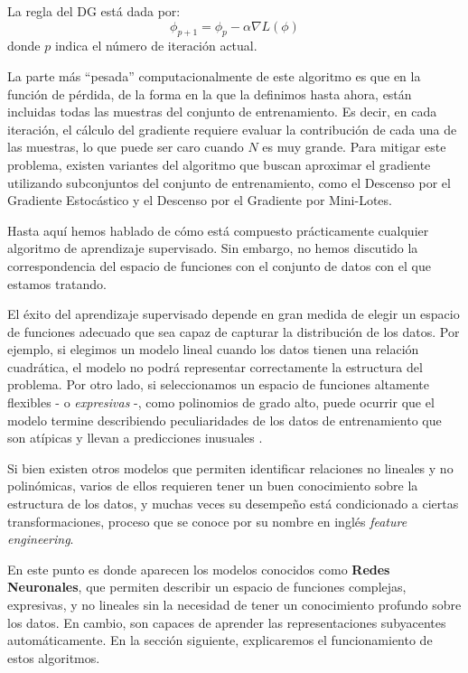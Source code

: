 \documentclass[../../main.tex]{subfiles}
\begin{document}
La regla del DG está dada por:
\[
\phi_{p+1} = \phi_{p} - \alpha \nabla L(\phi)
\]
donde \(p\) indica el número de iteración actual.

La parte más ``pesada'' computacionalmente de este algoritmo es que en la función de
pérdida, de la forma en la que la definimos hasta ahora, están incluidas todas las
muestras del conjunto de entrenamiento. Es decir, en cada iteración, el cálculo del
gradiente requiere evaluar la contribución de cada una de las muestras, lo que puede ser
caro cuando \(N\) es muy grande. Para mitigar este problema, existen variantes del
algoritmo que buscan aproximar el gradiente utilizando subconjuntos del conjunto de
entrenamiento, como el Descenso por el Gradiente Estocástico y el Descenso por el
Gradiente por Mini-Lotes.


\bigskip
Hasta aquí hemos hablado de cómo está compuesto prácticamente cualquier algoritmo de
aprendizaje supervisado. Sin embargo, no hemos discutido la correspondencia del espacio de
funciones con el conjunto de datos con el que estamos tratando.

El éxito del aprendizaje supervisado depende en gran medida de elegir un espacio de
funciones adecuado que sea capaz de capturar la distribución de los datos. Por ejemplo, si
elegimos un modelo lineal cuando los datos tienen una relación cuadrática, el modelo no
podrá representar correctamente la estructura del problema. Por otro lado, si
seleccionamos un espacio de funciones altamente flexibles - o \textit{expresivas} -, como
polinomios de grado alto, puede ocurrir que el modelo termine describiendo peculiaridades
de los datos de entrenamiento que son atípicas y llevan a predicciones inusuales
\cite{prince2024understanding}.

Si bien existen otros modelos que permiten identificar relaciones no lineales y no
polinómicas, varios de ellos requieren tener un buen conocimiento sobre la estructura de
los datos, y muchas veces su desempeño está condicionado a ciertas transformaciones,
proceso que se conoce por su nombre en inglés \textit{feature engineering}.

En este punto es donde aparecen los modelos conocidos como \textbf{Redes Neuronales}, que
permiten describir un espacio de funciones complejas, expresivas, y no lineales sin la
necesidad de tener un conocimiento profundo sobre los datos. En cambio, son capaces de
aprender las representaciones subyacentes automáticamente. En la sección siguiente,
explicaremos el funcionamiento de estos algoritmos.
\end{document}
